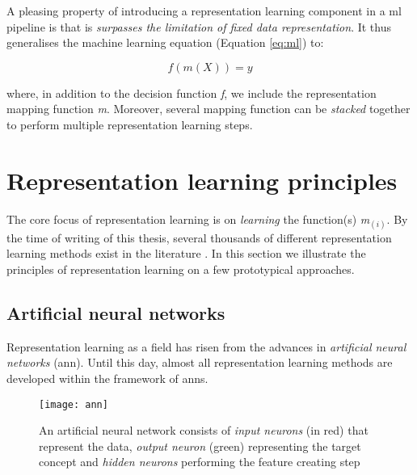 A pleasing property of introducing a representation learning component in a \gls{ml} pipeline is that is \textit{surpasses the limitation of fixed data representation}.
It thus generalises the machine learning equation (Equation \ref{eq:ml}) to:

\begin{equation}
	f(m(X)) = y
\end{equation}


where, in addition to the decision function \textit{f}, we include the representation mapping function \textit{m}.
Moreover, several mapping function can be \textit{stacked} together to perform multiple representation learning steps.







\section{Representation learning principles}


The core focus of representation learning is on \textit{learning} the function(s) \textit{m}$_{(i)}$.
By the time of writing of this thesis, several thousands of different representation learning methods exist in the literature \cite{Goodfellow2016}.
In this section we illustrate the principles of representation learning on a few prototypical approaches.


\subsection{Artificial neural networks}



Representation learning as a field has risen from the advances in \textit{artificial neural networks} (\gls{ann}).
Until this day, almost all representation learning methods are developed within the framework of \gls{ann}s.

\begin{figure}
	\centering
	\texttt{[image: ann]}
	\caption[Illustration of an artificial neural networks]{An artificial neural network consists of \textit{input neurons} (in red) that represent the data, \textit{output neuron} (green) representing the target concept and \textit{hidden neurons} performing the feature creating step}
	\label{fig:ann}
\end{figure}


